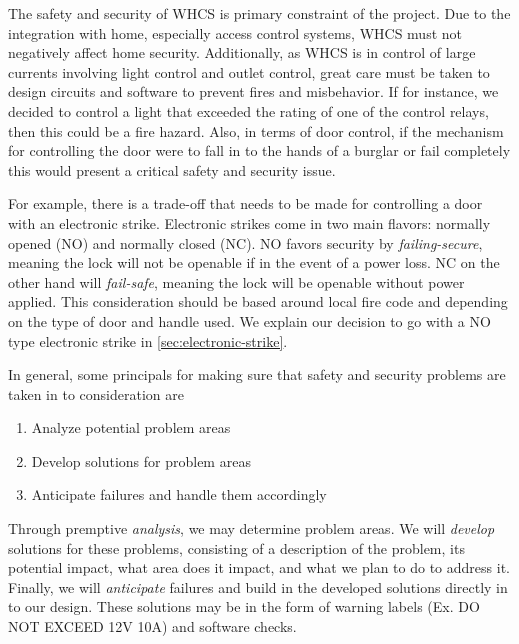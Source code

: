 The safety and security of WHCS is primary constraint of the project. Due to
the integration with home, especially access control systems, WHCS must not
negatively affect home security. Additionally, as WHCS is in control of large
currents involving light control and outlet control, great care must be taken
to design circuits and software to prevent fires and misbehavior. If for
instance, we decided to control a light that exceeded the rating of one of the
control relays, then this could be a fire hazard. Also, in terms of door
control, if the mechanism for controlling the door were to fall in to the hands
of a burglar or fail completely this would present a critical safety and
security issue.

For example, there is a trade-off that needs to be made for controlling a door
with an electronic strike. Electronic strikes come in two main flavors:
normally opened (NO) and normally closed (NC). NO favors security by
\emph{failing-secure}, meaning the lock will not be openable if in the event of
a power loss. NC on the other hand will \emph{fail-safe}, meaning the lock will
be openable without power applied. This consideration should be based around
local fire code and depending on the type of door and handle used. We explain
our decision to go with a NO type electronic strike in
\autoref{sec:electronic-strike}.

In general, some principals for making sure that safety and security problems
are taken in to consideration are

\begin{enumerate} \item Analyze potential problem areas \item Develop solutions
for problem areas \item Anticipate failures and handle them accordingly
\end{enumerate}

Through premptive \emph{analysis}, we may determine problem areas. We will
\emph{develop} solutions for these problems, consisting of a description of the
problem, its potential impact, what area does it impact, and what we plan to do
to address it. Finally, we will \emph{anticipate} failures and build in the
developed solutions directly in to our design. These solutions may be in the
form of warning labels (Ex. DO NOT EXCEED 12V 10A) and software checks.

